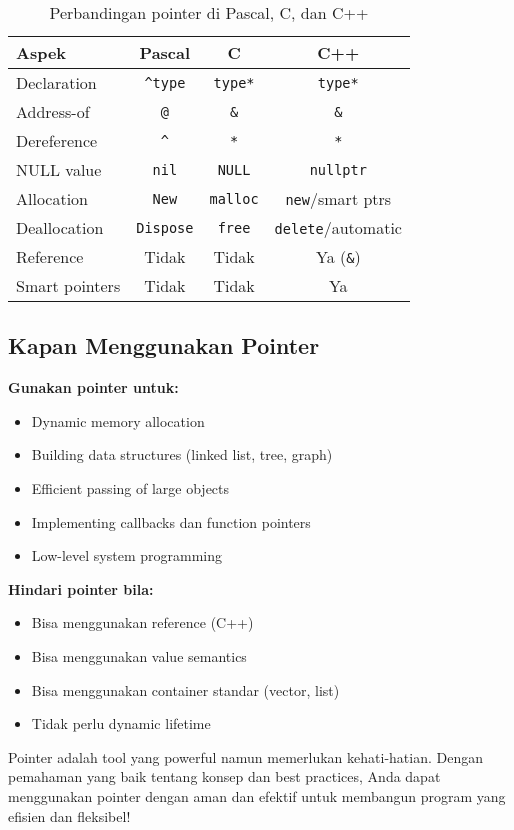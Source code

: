 \documentclass[../main.tex]{subfiles}
\begin{document}
\begin{table}[H]
\centering
\begin{tabular}{|l|c|c|c|}
\hline
\textbf{Aspek} & \textbf{Pascal} & \textbf{C} & \textbf{C++} \\
\hline
Declaration & \texttt{\^{}type} & \texttt{type*} & \texttt{type*} \\
\hline
Address-of & \texttt{@} & \texttt{\&} & \texttt{\&} \\
\hline
Dereference & \texttt{\^{}} & \texttt{*} & \texttt{*} \\
\hline
NULL value & \texttt{nil} & \texttt{NULL} & \texttt{nullptr} \\
\hline
Allocation & \texttt{New} & \texttt{malloc} & \texttt{new}/smart ptrs \\
\hline
Deallocation & \texttt{Dispose} & \texttt{free} & \texttt{delete}/automatic \\
\hline
Reference & Tidak & Tidak & Ya (\texttt{\&}) \\
\hline
Smart pointers & Tidak & Tidak & Ya \\
\hline
\end{tabular}
\caption{Perbandingan pointer di Pascal, C, dan C++}
\end{table}

\subsection{Kapan Menggunakan Pointer}

\textbf{Gunakan pointer untuk:}
\begin{itemize}
  \item Dynamic memory allocation
  \item Building data structures (linked list, tree, graph)
  \item Efficient passing of large objects
  \item Implementing callbacks dan function pointers
  \item Low-level system programming
\end{itemize}

\textbf{Hindari pointer bila:}
\begin{itemize}
  \item Bisa menggunakan reference (C++)
  \item Bisa menggunakan value semantics
  \item Bisa menggunakan container standar (vector, list)
  \item Tidak perlu dynamic lifetime
\end{itemize}

Pointer adalah tool yang powerful namun memerlukan kehati-hatian. Dengan pemahaman yang baik tentang konsep dan best practices, Anda dapat menggunakan pointer dengan aman dan efektif untuk membangun program yang efisien dan fleksibel!
\end{document}
